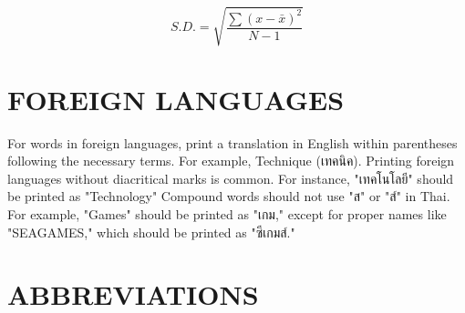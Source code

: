 \begin{equation}
S.D. = \sqrt{\frac{\sum(x - \bar{x})^2}{N - 1}}
\label{eq:3.1}
\end{equation}

\section{FOREIGN LANGUAGES}

For words in foreign languages, print a translation in English within parentheses following the necessary terms. For example, Technique (เทคนิค). Printing foreign languages without diacritical marks is common. For instance, "เทคโนโลยี" should be printed as "Technology" Compound words should not use "ส" or "ส์" in Thai. For example, "Games" should be printed as "เกม," except for proper names like "SEAGAMES," which should be printed as "ซีเกมส์."

\section{ABBREVIATIONS}

